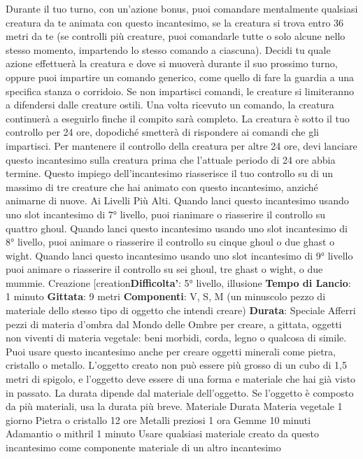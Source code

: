 \begin{multicols}{2}
Durante il tuo turno, con un’azione bonus, puoi
comandare mentalmente qualsiasi creatura da te
animata con questo incantesimo, se la creatura si trova
entro 36 metri da te (se controlli più creature, puoi
comandarle tutte o solo alcune nello stesso momento,
impartendo lo stesso comando a ciascuna). Decidi tu
quale azione effettuerà la creatura e dove si muoverà
durante il suo prossimo turno, oppure puoi impartire un
comando generico, come quello di fare la guardia a una
specifica stanza o corridoio. Se non impartisci comandi,
le creature si limiteranno a difendersi dalle creature
ostili. Una volta ricevuto un comando, la creatura
continuerà a eseguirlo finche il compito sarà completo.
La creatura è sotto il tuo controllo per 24 ore, dopodiché
smetterà di rispondere ai comandi che gli impartisci.
Per mantenere il controllo della creatura per altre 24
ore, devi lanciare questo incantesimo sulla creatura
prima che l’attuale periodo di 24 ore abbia termine.
Questo impiego dell’incantesimo riasserisce il tuo
controllo su di un massimo di tre creature che hai
animato con questo incantesimo, anziché animarne di
nuove.
Ai Livelli Più Alti. Quando lanci questo incantesimo
usando uno slot incantesimo di 7° livello, puoi rianimare
o riasserire il controllo su quattro ghoul. Quando lanci
questo incantesimo usando uno slot incantesimo di 8°
livello, puoi animare o riasserire il controllo su cinque
ghoul o due ghast o wight. Quando lanci questo
incantesimo usando uno slot incantesimo di 9° livello
puoi animare o riasserire il controllo su sei ghoul, tre
ghast o wight, o due mummie.
Creazione
[creation\textbf{Difficolta'}:
5° livello, illusione
\textbf{Tempo di Lancio}: 1 minuto
\textbf{Gittata}: 9 metri
\textbf{Componenti}: V, S, M (un minuscolo pezzo di materiale
dello stesso tipo di oggetto che intendi creare)
\textbf{Durata}: Speciale
Afferri pezzi di materia d’ombra dal Mondo delle Ombre
per creare, a gittata, oggetti non viventi di materia
vegetale: beni morbidi, corda, legno o qualcosa di
simile. Puoi usare questo incantesimo anche per creare
oggetti minerali come pietra, cristallo o metallo.
L’oggetto creato non può essere più grosso di un cubo
di 1,5 metri di spigolo, e l’oggetto deve essere di una
forma e materiale che hai già visto in passato.
La durata dipende dal materiale dell’oggetto. Se
l’oggetto è composto da più materiali, usa la durata più
breve.
Materiale Durata
Materia vegetale 1 giorno
Pietra o cristallo 12 ore
Metalli preziosi 1 ora
Gemme 10 minuti
Adamantio o mithril 1 minuto
Usare qualsiasi materiale creato da questo incantesimo
come componente materiale di un altro incantesimo

\end{multicols}

